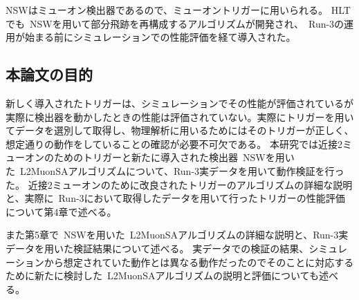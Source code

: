 NSWはミューオン検出器であるので、ミューオントリガーに用いられる。
HLTでも~NSWを用いて部分飛跡を再構成するアルゴリズムが開発され、~Run-3の運用が始まる前にシミュレーションでの性能評価を経て導入された。

\subsection{本論文の目的}\label{chapter3-4}
新しく導入されたトリガーは、シミュレーションでその性能が評価されているが実際に検出器を動かしたときの性能は評価されていない。実際にトリガーを用いてデータを選別して取得し、物理解析に用いるためにはそのトリガーが正しく、想定通りの動作をしていることの確認が必要不可欠である。
本研究では近接2ミューオンのためのトリガーと新たに導入された検出器~NSWを用いた~L2MuonSAアルゴリズムについて、Run-3実データを用いて動作検証を行った。
近接2ミューオンのために改良されたトリガーのアルゴリズムの詳細な説明と、実際に~Run-3において取得したデータを用いて行ったトリガーの性能評価について第4章で述べる。

また第5章で~NSWを用いた~L2MuonSAアルゴリズムの詳細な説明と、Run-3実データを用いた検証結果について述べる。
実データでの検証の結果、シミュレーションから想定されていた動作とは異なる動作だったのでそのことに対応するために新たに検討した~L2MuonSAアルゴリズムの説明と評価についても述べる。